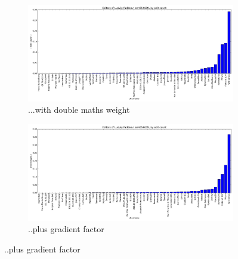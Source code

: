\begin{figure}[H]
  \ContinuedFloat  
  \centering

  \begin{subfigure}[b]{0.7\linewidth}
    \centering
    \includegraphics[width=\linewidth]{img/weightings/LudvigFaddeevMaths.png}
    \caption{...with double maths weight}
  \end{subfigure}


  \begin{subfigure}[b]{0.7\linewidth}
    \centering
    \includegraphics[width=\linewidth]{img/weightings/LudvigFaddeevMathsGradient.png}
    \caption{..plus gradient factor}
  \end{subfigure}
  


\end{figure}
